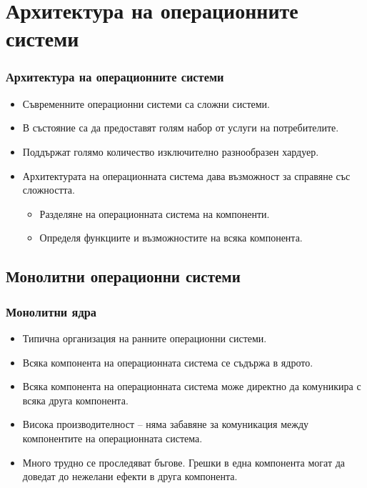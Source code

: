 \documentclass[ignorenonframetext, hyperref=unicode]{beamer}
\begin{document}
\section{Архитектура на операционните системи}

\begin{frame}
\frametitle{Архитектура на операционните системи}
\begin{itemize}
\item Съвременните операционни системи са сложни системи.
\item В състояние са да предоставят голям набор от услуги на потребителите.
\item Поддържат голямо количество изключително разнообразен хардуер.
\item Архитектурата на операционната система дава възможност за справяне със
сложността.
\begin{itemize}
  \item Разделяне на операционната система на компоненти.
  \item Определя функциите и възможностите на всяка компонента.
\end{itemize}
\end{itemize}
\end{frame}

\subsection{Монолитни операционни системи}

\begin{frame}
\frametitle{Монолитни ядра}
\begin{itemize}
\item Типична организация на ранните операционни системи.
\item Всяка компонента на операционната система се съдържа в ядрото.
\item Всяка компонента на операционната система може директно да комуникира с
всяка друга компонента.
\item Висока производителност -- няма забавяне за комуникация между компонентите
на операционната система.
\item Много трудно се проследяват бъгове. Грешки в една компонента могат да
доведат до нежелани ефекти в друга компонента.
\end{itemize}
\end{frame}
\end{document}
